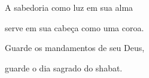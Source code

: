 \movetooddpage
\raggedright %

\vspace*{1cm}

A sabedoria como luz em sua alma

serve em sua cabeça como uma coroa.

Guarde os mandamentos de seu Deus,

guarde o dia sagrado do shabat.\\[10pt]




\endgroup

%
%
%
%
%

